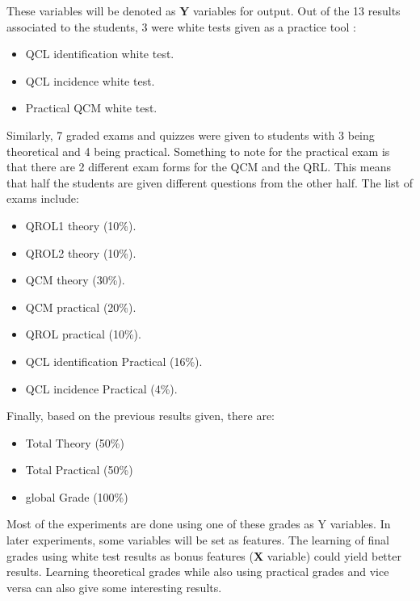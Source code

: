 \documentclass[a4paper,11pt]{report}
\numberwithin{figure}{section} %
\begin{document}
    These variables will be denoted as \textbf{Y} variables for output.
    Out of the 13 results associated to the students, 3 were white tests given as a practice tool : 
    \begin{itemize}
    \item[\textbullet]  QCL identification white test.
	\item[\textbullet]  QCL incidence white test.
	\item[\textbullet]  Practical QCM white test.
    \end{itemize}
    Similarly, 7 graded exams and quizzes were given to students with 3 being theoretical and 4 being practical.
    Something to note for the practical exam is that there are 2 different exam forms for the QCM and the QRL. This means that half the students are given different questions from the other half.
    The list of exams include:
    \begin{itemize}
    \item[\textbullet]  QROL1 theory (10\%).
    \item[\textbullet]  QROL2 theory (10\%).
    \item[\textbullet]  QCM theory (30\%).
    \item[\textbullet]  QCM practical (20\%).
    \item[\textbullet]  QROL practical (10\%).
    \item[\textbullet]  QCL identification Practical (16\%).
    \item[\textbullet]  QCL incidence Practical (4\%).
    \end{itemize}
    Finally, based on the previous results given, there are:
    \begin{itemize}
    \item[\textbullet] Total Theory (50\%)
    \item[\textbullet] Total Practical (50\%)
    \item[\textbullet] global Grade (100\%)
    \end{itemize}
    
    Most of the experiments are done using one of these grades as Y variables.
    In later experiments, some variables will be set as features.
    The learning of final grades using white test results as bonus features (\textbf{X} variable) could yield better results.
    Learning theoretical grades while also using practical grades and vice versa can also give some interesting results. \\
    
\end{document}
